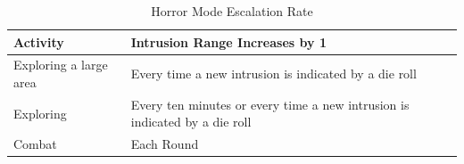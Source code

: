 \begin{table}[h]
\centering 
\caption{Horror Mode Escalation Rate}
\label{tab:Horror Mode Escalation Rate}

\begin{tabularx}{\textwidth}{| Y | Y |}
\hline

\textbf{Activity} & \textbf{Intrusion Range Increases by 1} \\ \hline
Exploring a large area & Every time a new intrusion is indicated by a die roll \\ \hline
Exploring & Every ten minutes or every time a new intrusion is indicated by a die roll \\ \hline
Combat & Each Round \\ \hline

\end{tabularx}
\end{table}

